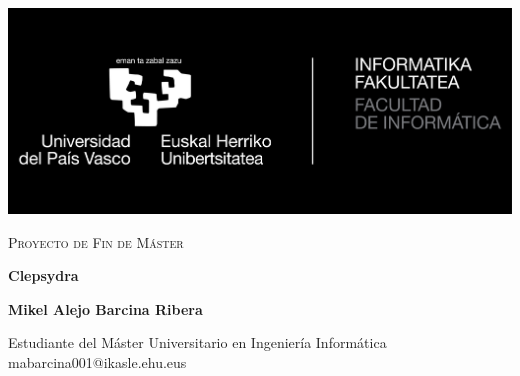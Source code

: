 
\begin{titlepage}

  \pagecolor{black}\afterpage{\nopagecolor}
  \afterpage{\null\thispagestyle{empty}\newpage}

  \color{white}
  \centering

  \includegraphics[scale=0.4]{img/logo_upvehu_facultad}\par

  \vspace{5cm}

  {\scshape\Large Proyecto de Fin de Máster \par}

  \vspace{0.5cm}

  {\Huge\bfseries Clepsydra\par}

  \vfill

  \Large \textbf{Mikel Alejo Barcina Ribera}\par
  \small Estudiante del Máster Universitario en Ingeniería Informática
  mabarcina001@ikasle.ehu.eus

\end{titlepage}
